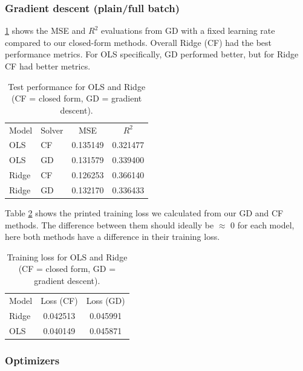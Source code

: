 \documentclass[amssymb,twocolumn,aps]{revtex4-2}
\begin{document}
\subsubsection{Gradient descent (plain/full batch)}

\ref{tab:test-ols-ridge} shows the MSE and $R^2$ evaluations from GD with a fixed learning rate compared to our closed-form methods. Overall Ridge (CF) had the best performance metrics. For OLS specifically, GD performed better, but for Ridge CF had better metrics. 

\begin{table}[h!]  %
\caption{Test performance for OLS and Ridge (CF = closed form, GD = gradient descent).}
\label{tab:test-ols-ridge}
\begin{ruledtabular}
\begin{tabular}{llcc} %
Model & Solver & MSE & $R^2$ \\
\colrule
OLS   & CF & 0.135149 & 0.321477 \\
OLS   & GD & 0.131579 & 0.339400 \\
Ridge & CF & 0.126253 & 0.366140 \\
Ridge & GD & 0.132170 & 0.336433 \\
\end{tabular}
\end{ruledtabular}
\end{table}

Table \ref{tab:train-ols-ridge} shows the printed training loss we calculated from our GD and CF methods. The difference between them should ideally be $\approx$ 0 for each model, here both methods have a difference in their training loss. 

\begin{table}[h!]
\caption{Training loss for OLS and Ridge (CF = closed form, GD = gradient descent).}
\label{tab:train-ols-ridge}
\begin{ruledtabular}
\begin{tabular}{lcc}
Model & Loss (CF) & Loss (GD) \\
\colrule
Ridge & 0.042513 & 0.045991 \\
OLS   & 0.040149 & 0.045871 \\
\end{tabular}
\end{ruledtabular}
\end{table}

\subsubsection{Optimizers}
\end{document}
